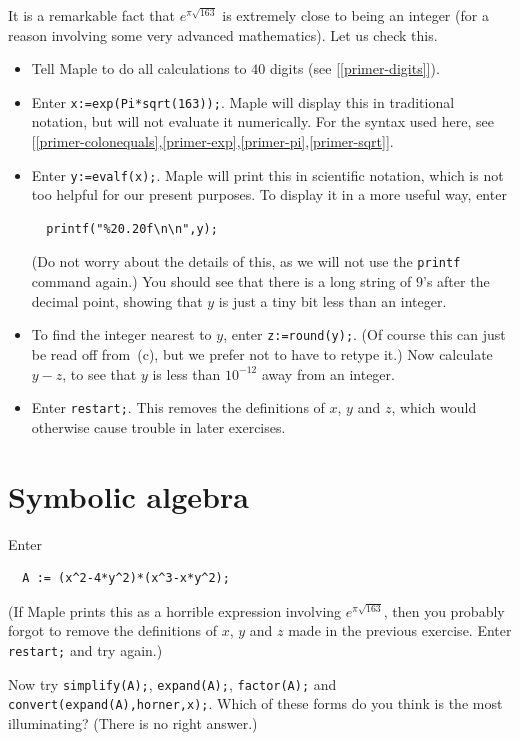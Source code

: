 \documentclass[a4paper,10pt]{amsbook}
\begin{document}
\begin{exercise}\label{ex-near-int}
 It is a remarkable fact that $e^{\pi\sqrt{163}}$ is extremely close
 to being an integer (for a reason involving some very advanced
 mathematics).  Let us check this. 
 \begin{itemize}
  \item[(a)] Tell Maple to do all calculations to $40$
   digits (see [\ref{primer-digits}]).
  \item[(b)] Enter \verb~x:=exp(Pi*sqrt(163));~.  Maple will
   display this in traditional notation, but will not evaluate it
   numerically.  For the syntax used here, see
   [\ref{primer-colonequals},\ref{primer-exp},\ref{primer-pi},\ref{primer-sqrt}]. 
  \item[(c)] Enter \verb~y:=evalf(x);~.  Maple will print this in
   scientific notation, which is not too helpful for our present
   purposes.  To display it in a more useful way, enter
\begin{verbatim}
  printf("%20.20f\n\n",y);
\end{verbatim}
   (Do not worry about the details of this, as we will not
   use the \verb~printf~ command again.)  You should see
   that there is a long string of $9$'s after the decimal
   point, showing that $y$ is just a tiny bit less than an
   integer. 
  \item[(d)] To find the integer nearest to $y$, enter
   \verb~z:=round(y);~.  (Of course this can just be read off
   from~(c), but we prefer not to have to retype it.)  Now calculate
   $y-z$, to see that $y$ is less than $10^{-12}$ away from an
   integer. 
  \item[(e)] Enter \verb~restart;~.  This removes the definitions of
   $x$, $y$ and $z$, which would otherwise cause trouble in later
   exercises. 
 \end{itemize}
\end{exercise}

\section{Symbolic algebra}

\begin{exercise}\label{ex-horner}
 Enter
\begin{verbatim}
  A := (x^2-4*y^2)*(x^3-x*y^2);
\end{verbatim}
 (If Maple prints this as a horrible expression involving
 $e^{\pi\sqrt{163}}$, then you probably forgot to remove the
 definitions of $x$, $y$ and $z$ made in the previous exercise.  Enter
 \verb~restart;~ and try again.) 
 
 Now try \verb~simplify(A);~, \verb~expand(A);~, \verb~factor(A);~ and
 \verb~convert(expand(A),horner,x);~.  Which of these forms do you think is
 the most illuminating?  (There is no right answer.) 
\end{exercise}
\end{document}
